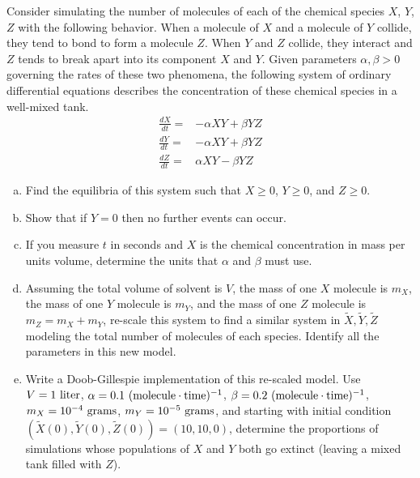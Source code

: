 \begin{exercises}
\item \label{ex:hw_chemical_rxn}
Consider simulating the number of molecules of each of the chemical species $X$, $Y$, $Z$ with the following behavior. When a molecule of $X$ and a molecule of $Y$ collide, they tend to bond to form a molecule $Z$. When $Y$ and $Z$ collide, they interact and $Z$ tends to break apart into its component $X$ and $Y$. Given parameters $\alpha, \beta > 0$ governing the rates of these two phenomena, the following system of ordinary differential equations describes the concentration of these chemical species in a well-mixed tank.\begin{align*}
\frac{dX}{dt} =& -\alpha X Y + \beta Y Z\\
\frac{dY}{dt} =& -\alpha X Y + \beta Y Z\\
\frac{dZ}{dt} =& \alpha X Y - \beta Y Z
\end{align*}
\begin{enumerate}[(a)]
\item Find the equilibria of this system such that $X \geq 0$, $Y \geq 0$, and $Z \geq 0$.
\item Show that if $Y = 0$ then no further events can occur.
\item If you measure $t$ in seconds and $X$ is the chemical concentration in mass per units volume, determine the units that $\alpha$ and $\beta$ must use.

\item Assuming the total volume of solvent is $V$, the mass of one $X$ molecule is $m_X$, the mass of one $Y$ molecule is $m_Y$, and the mass of one $Z$ molecule is $m_Z=m_X + m_Y$, re-scale this system to find a similar system in $\widetilde{X}, \widetilde{Y}, \widetilde{Z}$ modeling the total number of molecules of each species. Identify all the parameters in this new model.

\item Write a Doob-Gillespie implementation of this re-scaled model. Use $V = 1\textup{ liter}$, $\alpha = 0.1\textup{ }(\textup{molecule}\cdot\textup{time})^{-1}$, $\beta = 0.2\textup{ }(\textup{molecule}\cdot\textup{time})^{-1}$, $m_X = 10^{-4}\textup{ grams}$, $m_Y = 10^{-5}\textup{ grams}$, and starting with initial condition $(\widetilde{X}(0), \widetilde{Y}(0), \widetilde{Z}(0)) = (10, 10, 0)$, determine the proportions of simulations whose populations of $X$ and $Y$ both go extinct (leaving a mixed tank filled with $Z$).
\end{enumerate}



\end{exercises}
